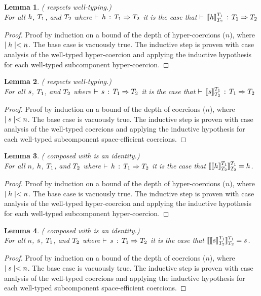 \documentclass[acmtog, authorversion, acmlarge]{acmart}
\newtheorem{lem}{Lemma}
\begin{document}
\begin{lem}
  \label{lem:iso_wt}
  ( respects well-typing.)\\
  For all $\HC$, $\T_1$, and $\T_2$ where $\cwt{\HC}{\T_1}{\T_2}$
  it is the case that $\cwt{\interp{\HC}{\T_1}{\T_2}}{\T_1}{\T_2}$
\end{lem}
\begin{proof}
  Proof by induction on a bound of the depth of hyper-coercions ($n$),
  where $\depth{\HC} < n$. The base case is vacuously true.
  The inductive step is proven with case analysis of the well-typed
  hyper-coercion and applying the inductive hypothesis for each well-typed
  subcomponent hyper-coercion. 
\end{proof}


\begin{lem}
  \label{lem:inv_wt}
  ( respects well-typing.)\\
  For all $\SE$, $\T_1$, and $\T_2$ where $\cwt{\SE}{\T_1}{\T_2}$
  it is the case that $\cwt{\interp{\SE}{\T_1}{\T_2}}{\T_1}{\T_2}$
\end{lem}
\begin{proof}
  Proof by induction on a bound of the depth of coercions ($n$),
  where $\depth{\SE} < n$. The base case is vacuously true.
  The inductive step is proven with case analysis of the well-typed
  coercions and applying the inductive hypothesis for each well-typed
  subcomponent space-efficient coercions. 
\end{proof}


\begin{lem}
  \label{lem:iso_id}
  ( composed with  is an identity.)\\
  For all $n$, $\HC$, $\T_1$, and $\T_2$ where
  $\cwt{\HC}{\T_1}{\T_2}$ it is the case that
  $\interp{\interp{\HC}{\T_1}{\T_2}}{\T_1}{\T_2} = \HC$.
\end{lem}
\begin{proof}
  Proof by induction on a bound of the depth of hyper-coercions ($n$),
  where $\depth{\HC} < n$.
  The base case is vacuously true.
  The inductive step is proven with case analysis of the well-typed
  hyper-coercion and applying the inductive hypothesis for each well-typed
  subcomponent hyper-coercion. 
\end{proof}

\begin{lem}
  \label{lem:inv_id}
  ( composed with  is an identity.)\\
  For all $n$, $\SE$, $\T_1$, and $\T_2$ where
  $\cwt{\SE}{\T_1}{\T_2}$ it is the case that
  $\interp{\interp{\SE}{\T_1}{\T_2}}{\T_1}{\T_2} = \SE$.
\end{lem}
\begin{proof}
  Proof by induction on a bound of the depth of coercions ($n$),
  where $\depth{\SE} < n$. The base case is vacuously true.
  The inductive step is proven with case analysis of the well-typed
  coercions and applying the inductive hypothesis for each well-typed
  subcomponent space-efficient coercions. 
\end{proof}
\end{document}
